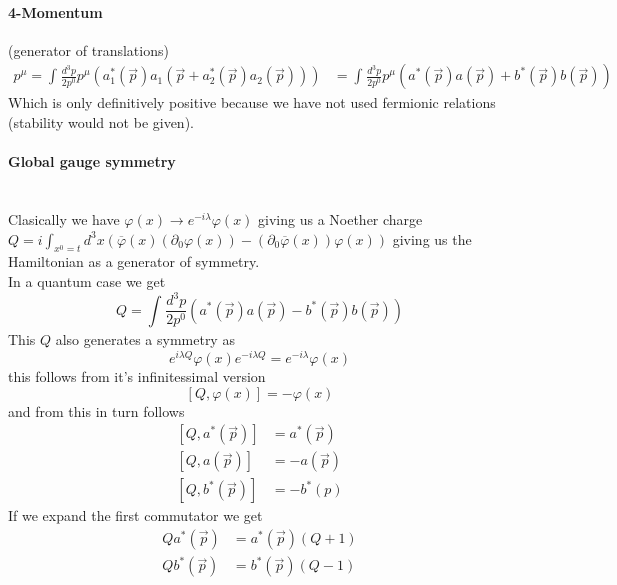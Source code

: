 \documentclass{report}
\begin{document}
\paragraph{4-Momentum} (generator of translations) 
\begin{align*}
p^{\mu} = \int_{}^{} \frac{d^3p}{2p^{0} } p^{\mu} \left( a_1^{*} \left( \vec{p} \right) a_1\left( \vec{p} + a_2^{*} \left( \vec{p} \right) a_2\left( \vec{p} \right)  \right)  \right)  
&= \int_{}^{} \frac{d^3p}{2p^{0} } p^{\mu} \left( a^{*} \left( \vec{p} \right) a\left( \vec{p} \right) + b^{*} \left( \vec{p} \right) b\left( \vec{p} \right)  \right)  
\end{align*}
Which is only definitively positive because we have not used fermionic relations (stability would not be given).
\paragraph{Global gauge symmetry}\\
Clasically we have $\varphi\left( x \right) \to e^{-i\lambda} \varphi\left( x \right) $ giving us a Noether charge $Q = i \int_{x^{0} = t}^{} d^3x \left( \overline{\varphi}\left( x \right) \left( \partial_0 \varphi\left( x \right)   \right)  - \left( \partial_0 \overline{\varphi}\left( x \right)   \right) \varphi\left( x \right)  \right)   $ giving us the Hamiltonian as a generator of symmetry.\\
In a quantum case we get \[
  Q = \int_{}^{} \frac{d^3p}{2p^{0} } \left( a^{*} \left( \vec{p} \right) a\left( \vec{p} \right) - b^{*} \left( \vec{p} \right) b\left( \vec{p} \right)  \right)
\] 
This $Q$ also generates a symmetry as
\[
e^{i\lambda Q} \varphi\left( x \right) e^{-i\lambda Q} = e^{-i \lambda} \varphi\left( x \right) 
\] this follows from it's infinitessimal version \[
\left[ Q, \varphi\left( x \right)  \right] = - \varphi\left( x \right) 
\] and from this in turn follows
\begin{align*}
  \left[ Q, a^{*} \left( \vec{p} \right) \right] &= a^{*} \left( \vec{p} \right)  \\
\left[ Q, a\left( \vec{p} \right)  \right] &=  - a\left( \vec{p} \right)  \\
\left[ Q, b^{*} \left( \vec{p} \right)  \right] &= - b^{*} \left( p \right)
\end{align*}
If we expand the first commutator we get
\begin{align*}
  Q a^{*} \left( \vec{p} \right) &= a^{*} \left( \vec{p} \right) \left( Q+1 \right)  \\
  Q b^{*} \left( \vec{p} \right) &= b^{*} \left( \vec{p} \right) \left( Q - 1 \right) 
\end{align*}
\end{document}
